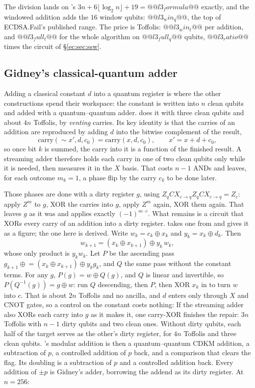 \noindent The division lands on \cite{ec:luo26}'s $3n+6\lfloor\log_2n\rfloor+19=@@l3_formula@@$
exactly, and the windowed addition adds the $16$ window qubits: $@@l3_win_q@@$, the top of
ECDSA.Fail's published range. The price is Toffolis: $@@l3_win_t@@$ per addition, and $@@l3_full_t@@$
for the whole algorithm on $@@l3_full_q@@$ qubits, $@@l3_ratio@@$ times the circuit of
\S\ref{ec:sec:ssw}.

\subsection{Gidney's classical-quantum adder}\label{ec:sec:cqadd}

Adding a classical constant $d$ into a quantum register is where the other constructions spend their
workspace: the constant is written into $n$ clean qubits and added with a quantum--quantum adder.
\cite{ec:gidney25} does it with three clean qubits and about $4n$ Toffolis, by \emph{venting}
carries. Its key identity is that the carries of an addition are reproduced by adding $d$ into the
bitwise complement of the result,
$$\mathrm{carry}(\sim\! x', d, c_0)=\mathrm{carry}(x, d, c_0),\qquad x'=x+d+c_0,$$
so once bit $k$ is summed, the carry into it is a function of the finished result. A streaming adder
therefore holds each carry in one of two clean qubits only while it is needed, then measures it in
the $X$ basis. That costs $n-1$ ANDs and leaves, for each outcome $m_k=1$, a phase flip by the carry
$c_k$ to be done later.

Those phases are done with a dirty register $g$, using $Z_qCX_{c\to q}Z_qCX_{c\to q}=Z_c$: apply
$Z^m$ to $g$, XOR the carries into $g$, apply $Z^m$ again, XOR them again. That leaves $g$ as it was
and applies exactly $(-1)^{m\cdot c}$. What remains is a circuit that XORs every carry of an addition
into a dirty register. \cite{ec:gidney25} takes one from \cite{ec:hrs17} and gives it as a figure;
the one here is derived. Write $w_k=c_k\oplus x_k$ and $y_k=x_k\oplus d_k$. Then
$$w_{k+1}=(x_k\oplus x_{k+1})\oplus y_k\,w_k,$$
whose only product is $y_kw_k$. Let $P$ be the ascending pass $g_{k+1}\mathrel{\oplus}=
(x_k\oplus x_{k+1})\oplus y_kg_k$, and $Q$ the same pass without the constant terms. For any $g$,
$P(g)=w\oplus Q(g)$, and $Q$ is linear and invertible, so $P(Q^{-1}(g))=g\oplus w$: run $Q$
descending, then $P$, then XOR $x_k$ in to turn $w$ into $c$. That is about $2n$ Toffolis and no
ancilla, and $d$ enters only through $X$ and CNOT gates, so a control on the constant costs nothing:
If the streaming adder also XORs each carry into $g$ as it makes it, one carry-XOR finishes the
repair: $3n$ Toffolis with $n-1$ dirty qubits and two clean ones. Without dirty qubits, each half of
the target serves as the other's dirty register, for $4n$ Toffolis and three clean qubits.
\cite{ec:luo26}'s modular addition is then a quantum--quantum CDKM addition, a subtraction of $p$,
a controlled addition of $p$ back, and a comparison that clears the flag. Its doubling is a
subtraction of $p$ and a controlled addition back. Every addition of $\pm p$ is Gidney's adder,
borrowing the addend as its dirty register. At $n=256$:

